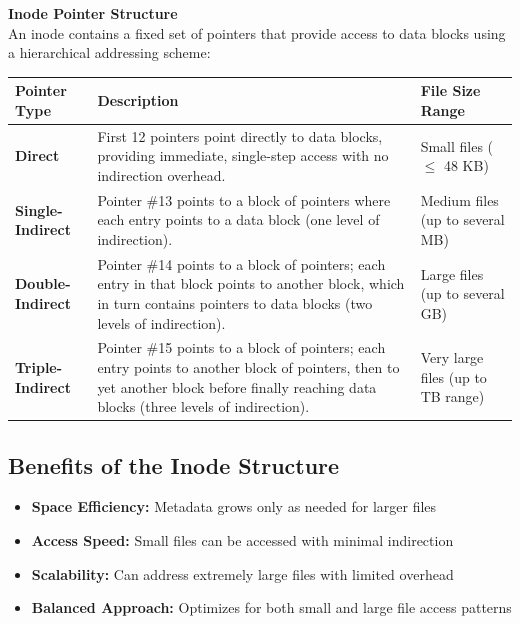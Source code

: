 \documentclass[../../compsys.tex]{subfiles}
\begin{document}
\begin{center}
  \textbf{Inode Pointer Structure}\\[0.5em]
  An inode contains a fixed set of pointers that provide access to data blocks using a hierarchical addressing scheme:
  
  \begin{tabularx}{\textwidth}{|C{0.23\textwidth}|X|C{0.23\textwidth}|}
    \hline
    \textbf{Pointer Type} & \textbf{Description} & \textbf{File Size Range} \\
    \hline
    \textbf{Direct} & 
    First 12 pointers point directly to data blocks, providing immediate, single-step access with no indirection overhead. 
    & Small files ($\leq$ 48 KB) \\
    \hline
    \textbf{Single-Indirect} & 
    Pointer \#13 points to a block of pointers where each entry points to a data block (one level of indirection). 
    & Medium files (up to several MB) \\
    \hline
    \textbf{Double-Indirect} & 
    Pointer \#14 points to a block of pointers; each entry in that block points to another block, which in turn contains pointers to data blocks (two levels of indirection). 
    & Large files (up to several GB) \\
    \hline
    \textbf{Triple-Indirect} & 
    Pointer \#15 points to a block of pointers; each entry points to another block of pointers, then to yet another block before finally reaching data blocks (three levels of indirection). 
    & Very large files (up to TB range) \\
    \hline
    \end{tabularx}
\end{center}

\subsection{Benefits of the Inode Structure}
\begin{itemize}
  \item \textbf{Space Efficiency:} Metadata grows only as needed for larger files
  \item \textbf{Access Speed:} Small files can be accessed with minimal indirection
  \item \textbf{Scalability:} Can address extremely large files with limited overhead
  \item \textbf{Balanced Approach:} Optimizes for both small and large file access patterns
\end{itemize}
\end{document}
